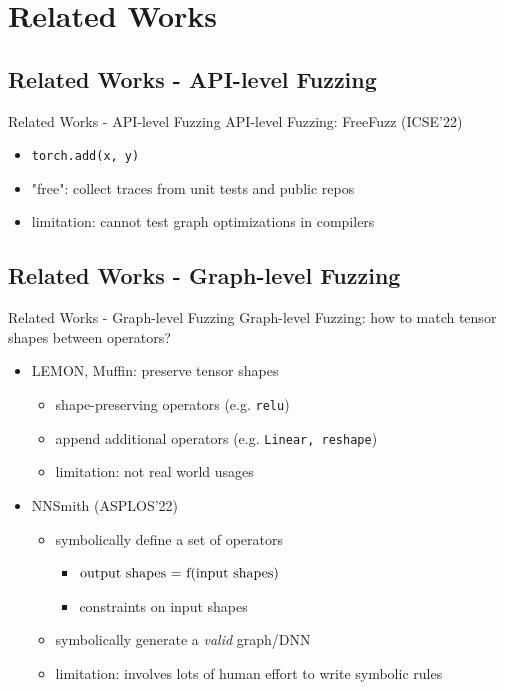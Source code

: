 \documentclass{beamer}
\begin{document}
\section{Related Works}
\subsection{Related Works - API-level Fuzzing}
\begin{frame}{Related Works - API-level Fuzzing}
    API-level Fuzzing: FreeFuzz (ICSE'22)
    \begin{itemize}
        \item \texttt{torch.add(x, y)}
        \item "free": collect traces from unit tests and public repos
        \item limitation: cannot test graph optimizations in compilers
    \end{itemize}
\end{frame}

\subsection{Related Works - Graph-level Fuzzing}
\begin{frame}{Related Works - Graph-level Fuzzing}
    Graph-level Fuzzing: how to match tensor shapes between operators?
    \begin{itemize}
        \item LEMON, Muffin: preserve tensor shapes
        \begin{itemize}
            \item shape-preserving operators (e.g. \texttt{relu})
            \item append additional operators (e.g. \texttt{Linear, reshape})
            \item limitation: not real world usages
        \end{itemize}
        \item NNSmith (ASPLOS'22)
        \begin{itemize}
            \item symbolically define a set of operators
            \begin{itemize}
                \item $\text{output shapes = f(\text{input shapes})}$
                \item constraints on input shapes
            \end{itemize}
            \item symbolically generate a \textit{valid} graph/DNN
            \item limitation: involves lots of human effort to write symbolic rules
        \end{itemize}
    \end{itemize}
\end{frame}
\end{document}
